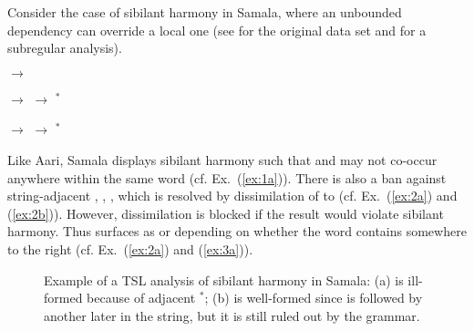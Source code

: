 \documentclass[11pt,a4paper]{article}
\begin{document}
Consider the case of sibilant harmony in Samala, where an unbounded dependency can override a local one (see \cite{Applegate72} for the original data set and \cite{McMullin16} for a subregular analysis).

\begin{exe}
    \ex\label{ex:1}\begin{xlist}
    	 \ex\label{ex:1a}  $\rightarrow$     
	\end{xlist}
    \ex\label{ex:2}\begin{xlist}
     	\ex\label{ex:2a}  $\rightarrow$  
    	\ex\label{ex:2b}   $\rightarrow$ $^*$
    \end{xlist}
     \ex\label{ex:3}\begin{xlist}
    	 \ex\label{ex:3a}     $\rightarrow$  
	 \ex\label{ex:3b}     $\rightarrow$  $^*$
	\end{xlist}
\end{exe}


Like Aari, Samala displays sibilant harmony such that \textipa{[s]} and \textipa{[S]} may not co-occur anywhere within the same word (cf. Ex.~(\ref{ex:1a})).
There is also a ban against string-adjacent \textipa{[st]}, \textipa{[sn]}, \textipa{[sl]}, which is resolved by dissimilation of \textipa{[s]} to \textipa{[S]} (cf. Ex.~(\ref{ex:2a}) and (\ref{ex:2b})). %
However, dissimilation is blocked if the result would violate sibilant harmony.
Thus  surfaces as \textipa{[Sn]} or \textipa{[sn]} depending on whether the word contains \textipa{[s]} somewhere to the right (cf. Ex.~(\ref{ex:2a}) and (\ref{ex:3a})).%


\begin{figure}[t]
\centering
       \hspace{2cm}
        
        \caption{Example of a TSL analysis of sibilant harmony in Samala: (a) is ill-formed because of adjacent $^*$\textipa{[sn]}; (b) is well-formed since  \textipa{[sn]} is followed by another  \textipa{[s]} later in the string, but it is still ruled out by the grammar.}
        \label{fig:SAMALA1}
        \end{figure}
\end{document}
